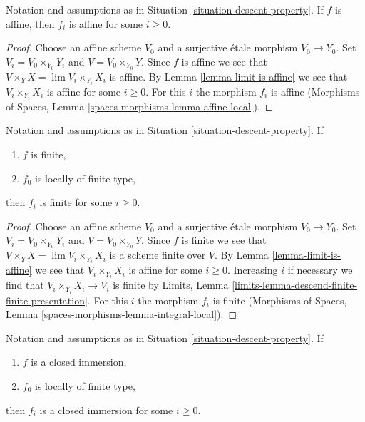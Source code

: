 \begin{lemma}
\label{lemma-descend-affine}
Notation and assumptions as in Situation \ref{situation-descent-property}. If
$f$ is affine, then $f_i$ is affine for some $i \geq 0$.
\end{lemma}

\begin{proof}
Choose an affine scheme $V_0$ and a surjective \'etale morphism $V_0 \to Y_0$.
Set $V_i = V_0 \times_{Y_0} Y_i$ and $V = V_0 \times_{Y_0} Y$.
Since $f$ is affine we see that $V \times_Y X = \lim V_i \times_{Y_i} X_i$
is affine. By Lemma \ref{lemma-limit-is-affine} we see that
$V_i \times_{Y_i} X_i$ is affine for some $i \geq 0$. For this $i$ the morphism
$f_i$ is affine
(Morphisms of Spaces, Lemma \ref{spaces-morphisms-lemma-affine-local}).
\end{proof}

\begin{lemma}
\label{lemma-descend-finite}
Notation and assumptions as in Situation \ref{situation-descent-property}. If
\begin{enumerate}
\item $f$ is finite,
\item $f_0$ is locally of finite type,
\end{enumerate}
then $f_i$ is finite for some $i \geq 0$.
\end{lemma}

\begin{proof}
Choose an affine scheme $V_0$ and a surjective \'etale morphism $V_0 \to Y_0$.
Set $V_i = V_0 \times_{Y_0} Y_i$ and $V = V_0 \times_{Y_0} Y$.
Since $f$ is finite we see that $V \times_Y X = \lim V_i \times_{Y_i} X_i$
is a scheme finite over $V$. By Lemma \ref{lemma-limit-is-affine} we see that
$V_i \times_{Y_i} X_i$ is affine for some $i \geq 0$. Increasing $i$ if
necessary we find that $V_i \times_{Y_i} X_i \to V_i$ is finite by
Limits, Lemma \ref{limits-lemma-descend-finite-finite-presentation}.
For this $i$ the morphism $f_i$ is finite
(Morphisms of Spaces, Lemma \ref{spaces-morphisms-lemma-integral-local}).
\end{proof}

\begin{lemma}
\label{lemma-descend-closed-immersion}
Notation and assumptions as in Situation \ref{situation-descent-property}. If
\begin{enumerate}
\item $f$ is a closed immersion,
\item $f_0$ is locally of finite type,
\end{enumerate}
then $f_i$ is a closed immersion for some $i \geq 0$.
\end{lemma}

